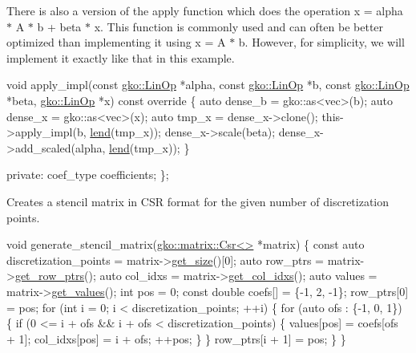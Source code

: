 There is also a version of the apply function which does the operation x = alpha $\ast$ A $\ast$ b + beta $\ast$ x. This function is commonly used and can often be better optimized than implementing it using x = A $\ast$ b. However, for simplicity, we will implement it exactly like that in this example.


\begin{DoxyCode}
    \textcolor{keywordtype}{void} apply\_impl(\textcolor{keyword}{const} \hyperlink{classgko_1_1LinOp}{gko::LinOp} *alpha, \textcolor{keyword}{const} \hyperlink{classgko_1_1LinOp}{gko::LinOp} *b,
                    \textcolor{keyword}{const} \hyperlink{classgko_1_1LinOp}{gko::LinOp} *beta, \hyperlink{classgko_1_1LinOp}{gko::LinOp} *x)\textcolor{keyword}{ const override}
\textcolor{keyword}{    }\{
        \textcolor{keyword}{auto} dense\_b = gko::as<vec>(b);
        \textcolor{keyword}{auto} dense\_x = gko::as<vec>(x);
        \textcolor{keyword}{auto} tmp\_x = dense\_x->clone();
        this->apply\_impl(b, \hyperlink{namespacegko_aa8cb4876b72e5e1036ea9575443c439b}{lend}(tmp\_x));
        dense\_x->scale(beta);
        dense\_x->add\_scaled(alpha, \hyperlink{namespacegko_aa8cb4876b72e5e1036ea9575443c439b}{lend}(tmp\_x));
    \}

\textcolor{keyword}{private}:
    coef\_type coefficients;
\};
\end{DoxyCode}


Creates a stencil matrix in C\+SR format for the given number of discretization points.


\begin{DoxyCode}
\textcolor{keywordtype}{void} generate\_stencil\_matrix(\hyperlink{classgko_1_1matrix_1_1Csr}{gko::matrix::Csr<>} *matrix)
\{
    \textcolor{keyword}{const} \textcolor{keyword}{auto} discretization\_points = matrix->\hyperlink{classgko_1_1LinOp_a31b3c003388eb0b95393154f68c2b98d}{get\_size}()[0];
    \textcolor{keyword}{auto} row\_ptrs = matrix->\hyperlink{classgko_1_1matrix_1_1Csr_a068e5158cf282fa977f0a137f8cd7f03}{get\_row\_ptrs}();
    \textcolor{keyword}{auto} col\_idxs = matrix->\hyperlink{classgko_1_1matrix_1_1Csr_a81c6294177a1be4873804c8a85a9fc64}{get\_col\_idxs}();
    \textcolor{keyword}{auto} values = matrix->\hyperlink{classgko_1_1matrix_1_1Csr_a929b0a194e6aeb1252b8e6781d162e83}{get\_values}();
    \textcolor{keywordtype}{int} pos = 0;
    \textcolor{keyword}{const} \textcolor{keywordtype}{double} coefs[] = \{-1, 2, -1\};
    row\_ptrs[0] = pos;
    \textcolor{keywordflow}{for} (\textcolor{keywordtype}{int} i = 0; i < discretization\_points; ++i) \{
        \textcolor{keywordflow}{for} (\textcolor{keyword}{auto} ofs : \{-1, 0, 1\}) \{
            \textcolor{keywordflow}{if} (0 <= i + ofs && i + ofs < discretization\_points) \{
                values[pos] = coefs[ofs + 1];
                col\_idxs[pos] = i + ofs;
                ++pos;
            \}
        \}
        row\_ptrs[i + 1] = pos;
    \}
\}
\end{DoxyCode}



